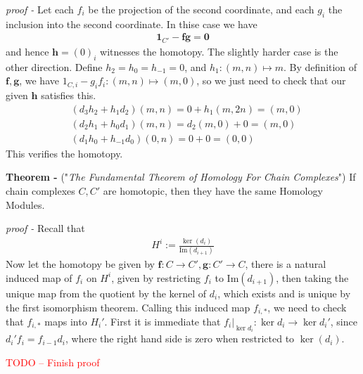 \documentclass[11pt]{article}
\theoremstyle{definition}
\newcommand{\im}{\text{Im}}
\begin{document}
\emph{proof - } Let each \(f_i\) be the projection of the second coordinate, and each \(g_i\) the inclusion into the second coordinate. In thise case we have
\begin{align*}
    \mathbf{1}_{C'} - \mathbf{fg} = \mathbf{0}
\end{align*}
and hence \(\mathbf{h} = (0)_i\) witnesses the homotopy. The slightly harder case is the other direction. Define \(h_2 = h_0 = h_{-1} = 0\), and \(h_1: (m,n) \mapsto m\). By definition of \(\mathbf{f}, \mathbf{g}\), we have \(1_{C,i} - g_if_i: (m,n) \mapsto (m,0)\), so we just need to check that our given \(\mathbf{h}\) satisfies this.
\begin{align*}
    &(d_3h_2 + h_1d_2)(m,n) = 0 + h_1(m,2n) = (m,0) \\
    &(d_2h_1 + h_0d_1)(m,n) = d_2(m,0) + 0 = (m,0) \\
    &(d_1h_0 + h_{-1}d_0)(0,n) = 0 + 0 = (0,0)
\end{align*}
This verifies the homotopy.




\textbf{Theorem - }\label{CCEx4} ("\emph{The Fundamental Theorem of Homology For Chain Complexes}") If chain complexes \(C,C'\) are homotopic, then they have the same Homology Modules.

\emph{proof - } Recall that
\begin{align*}
    H^i := \frac{\ker(d_i)}{\im(d_{i+1})}
\end{align*}
Now let the homotopy be given by \(\mathbf{f}:C \to C', \mathbf{g}:C' \to C\), there is a natural induced map of \(f_i\) on \(H^i\), given by restricting \(f_i\) to \(\im(d_{i+1})\), then taking the unique map from the quotient by the kernel of \(d_i\), which exists and is unique by the first isomorphism theorem. Calling this induced map \(f_{i,*}\), we need to check that
\(f_{i,*}\) maps into \(H_i'\). First it is immediate that \(f_i\vert_{\ker{d_i}}: \ker d_i \to \ker d_i'\), since \(d_i'f_i = f_{i-1}d_i\), where the right hand side is zero when restricted to \(\ker(d_i)\).

\textcolor{red}{TODO -- Finish proof}


\end{document}
